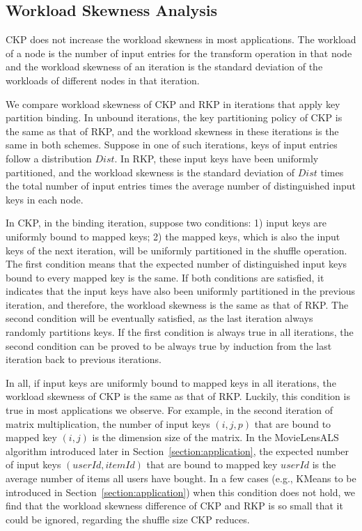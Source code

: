 \documentclass[10pt,journal,compsoc]{IEEEtran}
\begin{document}
\subsection{Workload Skewness Analysis}\label{section:skew}
CKP does not increase the workload skewness in most applications. 
The workload of a node is the number of input entries for the transform
operation in that node and 
the workload skewness of an iteration is the standard deviation of the workloads of different nodes in that iteration. 


We compare workload skewness of CKP and RKP in iterations 
that apply key partition binding.
In unbound iterations, the key partitioning policy of CKP is the same as that of RKP, and the workload skewness in these iterations is the same in both schemes.
Suppose in one of such iterations, keys of input entries follow a distribution $Dist$. 
In RKP, these input keys have been uniformly partitioned, 
and the workload skewness is the standard deviation of $Dist$ times 
the total number of input entries times
the average number of distinguished input keys in each node. 

In CKP, in the binding iteration, suppose two conditions: 
1) input keys are uniformly bound to mapped keys;
2) the mapped keys, which is also the input keys of the next iteration, will be uniformly partitioned in the shuffle operation.
The first condition means that the expected number of distinguished input keys bound to every mapped key is the same.
If both conditions are satisfied, it indicates that the input keys have also 
been uniformly partitioned in the previous iteration,
and therefore, the workload skewness is the same as that of RKP.
The second condition will be eventually satisfied, as the last iteration always randomly partitions keys. 
If the first condition is always true in all iterations, 
the second condition can be proved to be always true by induction from the last iteration back to previous iterations. 

In all, if input keys are uniformly bound to mapped keys in all iterations, the workload skewness of CKP 
is the same as that of RKP. 
Luckily, this condition is true in most applications we observe.
For example, in the second iteration of matrix multiplication, 
the number of input keys $(i,j,p)$ that
are bound to mapped key $(i,j)$ is the dimension size of the matrix.
In the MovieLensALS algorithm introduced later in Section~\ref{section:application}, the expected number of input keys $(userId, itemId)$
that are bound to mapped key $userId$ is the average number of items all users have bought.
In a few cases (e.g., KMeans to be introduced in Section~\ref{section:application}) when this condition does not hold, 
we find that the workload skewness difference of CKP and RKP is so small  that it could be ignored, regarding the shuffle size CKP reduces.
\end{document}
